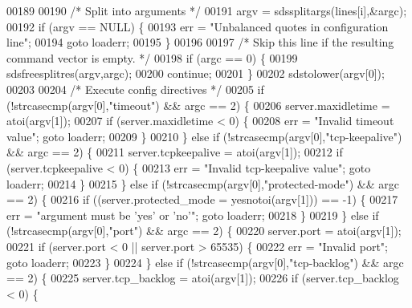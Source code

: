 \begin{DoxyCode}
00189 
00190         \textcolor{comment}{/* Split into arguments */}
00191         argv = sdssplitargs(lines[i],&argc);
00192         \textcolor{keywordflow}{if} (argv == NULL) \{
00193             err = \textcolor{stringliteral}{"Unbalanced quotes in configuration line"};
00194             \textcolor{keywordflow}{goto} loaderr;
00195         \}
00196 
00197         \textcolor{comment}{/* Skip this line if the resulting command vector is empty. */}
00198         \textcolor{keywordflow}{if} (argc == 0) \{
00199             sdsfreesplitres(argv,argc);
00200             \textcolor{keywordflow}{continue};
00201         \}
00202         sdstolower(argv[0]);
00203 
00204         \textcolor{comment}{/* Execute config directives */}
00205         \textcolor{keywordflow}{if} (!strcasecmp(argv[0],\textcolor{stringliteral}{"timeout"}) && argc == 2) \{
00206             server.maxidletime = atoi(argv[1]);
00207             \textcolor{keywordflow}{if} (server.maxidletime < 0) \{
00208                 err = \textcolor{stringliteral}{"Invalid timeout value"}; \textcolor{keywordflow}{goto} loaderr;
00209             \}
00210         \} \textcolor{keywordflow}{else} \textcolor{keywordflow}{if} (!strcasecmp(argv[0],\textcolor{stringliteral}{"tcp-keepalive"}) && argc == 2) \{
00211             server.tcpkeepalive = atoi(argv[1]);
00212             \textcolor{keywordflow}{if} (server.tcpkeepalive < 0) \{
00213                 err = \textcolor{stringliteral}{"Invalid tcp-keepalive value"}; \textcolor{keywordflow}{goto} loaderr;
00214             \}
00215         \} \textcolor{keywordflow}{else} \textcolor{keywordflow}{if} (!strcasecmp(argv[0],\textcolor{stringliteral}{"protected-mode"}) && argc == 2) \{
00216             \textcolor{keywordflow}{if} ((server.protected\_mode = yesnotoi(argv[1])) == -1) \{
00217                 err = \textcolor{stringliteral}{"argument must be 'yes' or 'no'"}; \textcolor{keywordflow}{goto} loaderr;
00218             \}
00219         \} \textcolor{keywordflow}{else} \textcolor{keywordflow}{if} (!strcasecmp(argv[0],\textcolor{stringliteral}{"port"}) && argc == 2) \{
00220             server.port = atoi(argv[1]);
00221             \textcolor{keywordflow}{if} (server.port < 0 || server.port > 65535) \{
00222                 err = \textcolor{stringliteral}{"Invalid port"}; \textcolor{keywordflow}{goto} loaderr;
00223             \}
00224         \} \textcolor{keywordflow}{else} \textcolor{keywordflow}{if} (!strcasecmp(argv[0],\textcolor{stringliteral}{"tcp-backlog"}) && argc == 2) \{
00225             server.tcp\_backlog = atoi(argv[1]);
00226             \textcolor{keywordflow}{if} (server.tcp\_backlog < 0) \{

\end{DoxyCode}
